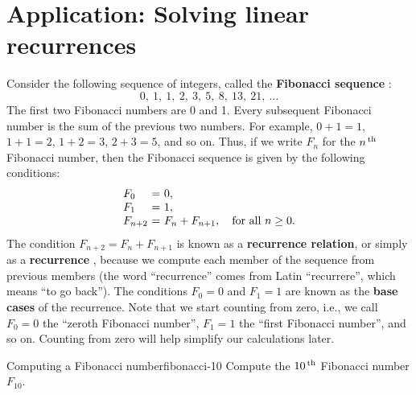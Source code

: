 \section{Application: Solving linear recurrences}

Consider the following sequence of integers, called the
\textbf{Fibonacci sequence}%
%
:
\begin{equation*}
  0,\ 1,\ 1,\ 2,\ 3,\ 5,\ 8,\ 13,\ 21,\ \ldots
\end{equation*}
The first two Fibonacci numbers are 0 and 1. Every subsequent
Fibonacci number is the sum of the previous two numbers. For example,
$0+1=1$, $1+1=2$, $1+2=3$, $2+3=5$, and so on. Thus, if we write $F_n$ for the
$n^{\,\rm th}$ Fibonacci number, then the Fibonacci sequence is given by the
following conditions:
\begin{equation*}
  \begin{array}{l@{~}c@{~}l}
    F_0 &=& 0, \\
    F_1 &=& 1, \\
    F_{n+2} &=& F_{n} + F_{n+1}, \quad\mbox{for all $n\geq 0$.}\\
  \end{array}
\end{equation*}
The condition $F_{n+2} = F_{n} + F_{n+1}$ is known as a
\textbf{recurrence relation}, or simply as a \textbf{recurrence}%
, because we compute each member of the sequence
from previous members (the word ``recurrence'' comes from Latin
``recurrere'', which means ``to go back''). The conditions $F_0=0$ and
$F_1=1$ are known as the \textbf{base cases}%
%
 of the recurrence. Note that we
start counting from zero, i.e., we call $F_0=0$ the ``zeroth Fibonacci
number'', $F_1=1$ the ``first Fibonacci number'', and so on. Counting
from zero will help simplify our calculations later.

\begin{example}{Computing a Fibonacci number}{fibonacci-10}
  Compute the $10^{\,\rm th}$ Fibonacci number $F_{10}$.
\end{example}

